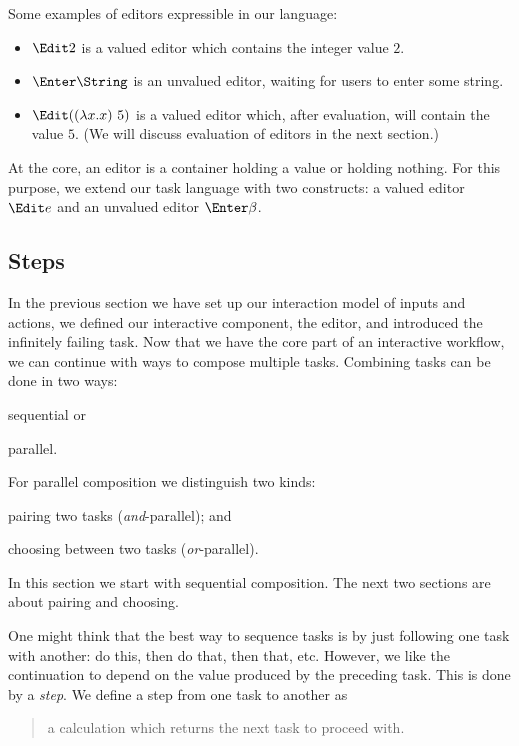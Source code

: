 Some examples of editors expressible in our language:
\begin{itemize}
  \item $\Edit 2$ is a valued editor which contains the integer value $2$.
  \item $\Enter \String$ is an unvalued editor,
    waiting for users to enter some string.
  \item $\Edit ((\lambda x . x)\ 5)$ is a valued editor which,
    after evaluation, will contain the value $5$.
    (We will discuss evaluation of editors in the next section.)
\end{itemize}

At the core,
an editor is a container holding a value
or holding nothing.
For this purpose, we extend our task language with two constructs:
a valued editor $\Edit e$ and an unvalued editor $\Enter \beta$.



\subsection{Steps}

In the previous section we have set up our interaction model of inputs and actions,
we defined our interactive component, the editor,
and introduced the infinitely failing task.
Now that we have the core part of an interactive workflow,
we can continue with ways to compose multiple tasks.
Combining tasks can be done in two ways:
\begin{enumerate*}
  \item sequential or
  \item parallel.
\end{enumerate*}
For parallel composition we distinguish two kinds:
\begin{enumerate*}[(a)]
  \item pairing two tasks (\emph{and}-parallel); and
  \item choosing between two tasks (\emph{or}-parallel).
\end{enumerate*}
In this section we start with sequential composition.
The next two sections are about pairing and choosing.

One might think that the best way to sequence tasks is by just following one task with another:
do this, then do that, then that, etc.
However, we like the continuation to depend on the value produced by the preceding task.
This is done by a \emph{step}.
We define a step from one task to another as
\begin{quote}
  a calculation which returns the next task to proceed with.
\end{quote}

